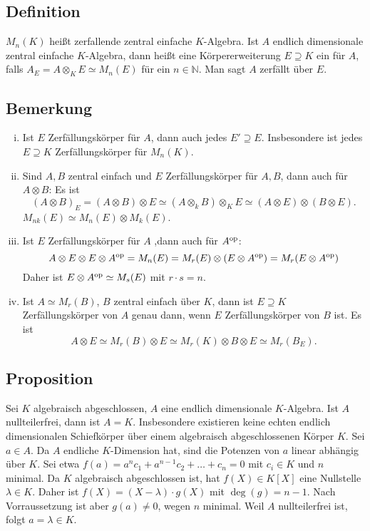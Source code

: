 \subsection[Definition: Zerfällungskörper über zerfallende zentral einfache $K$-Algebra]{Definition} %
\label{sub:326}
$M_n(K)$ heißt zerfallende zentral einfache $K$-Algebra. Ist $A$ endlich dimensionale zentral einfache $K$-Algebra, dann heißt eine Körpererweiterung $E \supseteq K$
ein  für $A$, falls $A_E = A \otimes_K E \simeq M_n(E)$ für ein $n \in \mathds{N}$. Man sagt $A$ zerfällt über $E$. 

\subsection{Bemerkung} %
\label{sub:327}
\begin{enumerate}[(i)]
	\item Ist $E$ Zerfällungskörper für $A$, dann auch jedes $E' \supseteq E $. Insbesondere ist jedes $E \supseteq K$ Zerfällungskörper für $M_n(K)$. 
	\item Sind $A,B$ zentral einfach und $E$ Zerfällungskörper für $A,B$, dann auch für $A \otimes B$: Es ist 
	\[
		(A \otimes B)_E = (A \otimes B) \otimes E \simeq (A \otimes_k B) \otimes_K E \simeq (A \otimes E) \otimes (B \otimes E).
	\]
	$M_{n k}(E) \simeq M_n(E) \otimes M_k(E)$.
	\item Ist $E$ Zerfällungskörper für $A$ ,dann auch für $A^{\mathrm{op}}$: 
	\[
		A \otimes E \otimes E \otimes A^{\mathrm{op}} = M_n(E) = M_r(E) \otimes (E \otimes A^{\mathrm{op}}) = M_r(E \otimes A^{\mathrm{op}})
	\]
	Daher ist $E \otimes A^{\mathrm{op}} \simeq M_s(E)$ mit $r \cdot s = n$.
	\item Ist $A \simeq M_r(B)$, $B$ zentral einfach über $K$, dann ist $E \supseteq K$ Zerfällungskörper von $A$ genau dann, wenn $E$ Zerfällungskörper von $B$ ist. Es ist
	\[
		A \otimes E \simeq M_r(B) \otimes E \simeq M_r(K) \otimes B \otimes E \simeq M_r(B_E).
	\]
\end{enumerate}

\subsection{Proposition} %
\label{sub:328}
Sei $K$ algebraisch abgeschlossen, $A$ eine endlich dimensionale $K$-Algebra. Ist $A$ nullteilerfrei, dann ist $A=K$. Insbesondere existieren keine echten endlich 
dimensionalen Schiefkörper über einem algebraisch abgeschlossenen Körper $K$.
Sei $a \in A$. Da $A$ endliche $K$-Dimension hat, sind die Potenzen von $a$ linear abhängig über $K$. Sei etwa $f(a) = a^n c_1  + a^{n-1} c_2 + \ldots + c_n = 0$ mit
$c_i \in K$ und $n$ minimal. Da $K$ algebraisch abgeschlossen ist, hat $f(X) \in K[X]$ eine Nullstelle $\lambda  \in K$. Daher ist $f(X)= (X- \lambda )\cdot g(X)$ mit 
$\deg(g) = n-1$. Nach Vorraussetzung ist aber $g(a) \not= 0$, wegen $n$ minimal. Weil $A$ nullteilerfrei ist, folgt $a= \lambda  \in K$. \bewende

